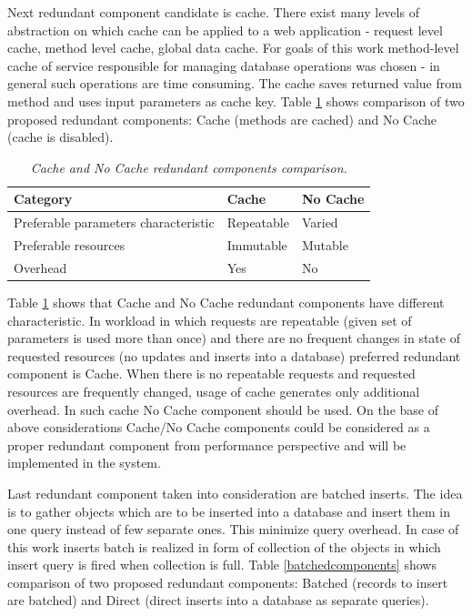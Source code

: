 \documentclass[10pt,a4paper]{article}
\begin{document}
Next redundant component candidate is cache. There exist many levels of abstraction on which cache can be applied to a web application - request level cache, method level cache, global data cache. For goals of this work method-level cache of service responsible for managing database operations was chosen - in general such operations are time consuming. The cache saves returned value from method and uses input parameters as cache key. Table \ref{cachecomponents} shows comparison of two proposed redundant components: Cache (methods are cached) and No Cache (cache is disabled).
\begin{table}[!htb]
\def\arraystretch{1.5}
\caption{\textit{Cache and No Cache redundant components comparison.}}\label{cachecomponents}
\begin{tabularx}{\textwidth}{p{6cm}|X|X}
  \textbf{Category} &\textbf{Cache} & \textbf{No Cache} \\
\hline
Preferable parameters characteristic & Repeatable & Varied \\
Preferable resources & Immutable & Mutable\\
Overhead & Yes & No\\
\end{tabularx}
\end{table}
 
Table \ref{cachecomponents} shows that Cache and No Cache redundant components have different characteristic. In workload in which requests are repeatable (given set of parameters is used more than once) and there are no frequent changes in state of requested resources (no updates and inserts into a database) preferred redundant component is Cache. When there is no repeatable requests and requested resources are frequently changed, usage of cache generates only additional overhead. In such cache No Cache component should be used. On the base of above considerations Cache/No Cache components could be considered as a proper redundant component from performance perspective and will be implemented in the system. 

Last redundant component taken into consideration are batched inserts. The idea is to gather objects which are to be inserted into a database and insert them in one query instead of few separate ones. This minimize query overhead. In case of this work inserts batch is realized in form of collection of the objects in which insert query is fired when collection is full.   
Table \ref{batchedcomponents} shows comparison of two proposed redundant components: Batched (records to insert are batched) and Direct (direct inserts into a database as separate queries).
\end{document}
